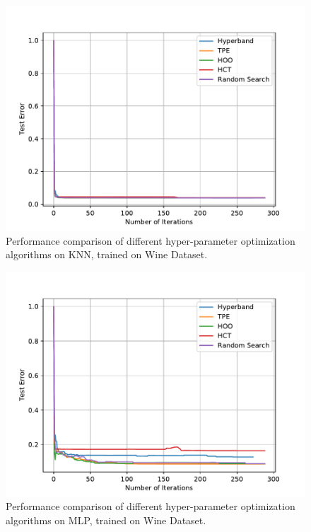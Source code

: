 \documentclass[runningheads,a4paper]{llncs}
\begin{document}
\begin{figure}[ht]
    \centering
    \includegraphics[scale=0.8]{img/uci/knn_0.pdf}
    \caption{Performance comparison of different hyper-parameter optimization algorithms on KNN, trained on Wine Dataset.}
    \label{knn_0}
\end{figure}

\begin{figure}[ht]
    \centering
    \includegraphics[scale=0.8]{img/uci/sk_mlp_0.pdf}
    \caption{Performance comparison of different hyper-parameter optimization algorithms on MLP, trained on Wine Dataset.}
    \label{sk_mlp_0}
\end{figure}
\end{document}
